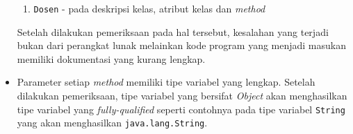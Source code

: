 \begin{itemize}
\begin{enumerate}
			\item {\tt Dosen} - pada deskripsi kelas, atribut kelas dan {\it method}
		\end{enumerate}
		Setelah dilakukan pemeriksaan pada hal tersebut, kesalahan yang terjadi bukan dari perangkat lunak melainkan kode program yang menjadi masukan memiliki dokumentasi yang kurang lengkap.
	\item Parameter setiap {\it method} memiliki tipe variabel yang lengkap. Setelah dilakukan pemeriksaan, tipe variabel yang bersifat {\it Object} akan menghasilkan tipe variabel yang {\it fully-qualified} seperti contohnya pada tipe variabel {\tt String} yang akan menghasilkan {\tt java.lang.String}.
\end{itemize}






















